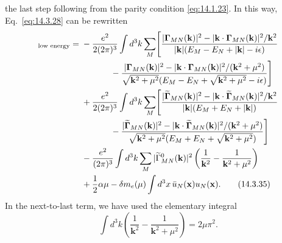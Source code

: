 the last step following from the parity condition \eqref{eq:14.1.23}. In this
way, Eq.~\eqref{eq:14.3.28} can be rewritten
\begin{align}
[\delta E_N]_{\text{low energy}}={}&
-\frac{e^2}{2(2\pi)^3}\int d^3k\sum_M\Biggl[
\frac{|\boldsymbol\Gamma_{MN}(\mathbf k)|^2
-|\mathbf k\cdot\boldsymbol\Gamma_{MN}(\mathbf k)|^2/\mathbf k^2}
{|\mathbf k|(E_M-E_N+|\mathbf k|-i\epsilon)}\notag\\
&\hspace{12mm}-
\frac{|\boldsymbol\Gamma_{MN}(\mathbf k)|^2
-|\mathbf k\cdot\boldsymbol\Gamma_{MN}(\mathbf k)|^2/(\mathbf k^2+\mu^2)}
{\sqrt{\mathbf k^2+\mu^2}
(E_M-E_N+\sqrt{\mathbf k^2+\mu^2}-i\epsilon)}\Biggr]\notag\\
&+\frac{e^2}{2(2\pi)^3}\int d^3k\sum_M\Biggl[
\frac{|\widetilde{\boldsymbol\Gamma}_{MN}(\mathbf k)|^2
-|\mathbf k\cdot\widetilde{\boldsymbol\Gamma}_{MN}(\mathbf k)|^2/\mathbf k^2}
{|\mathbf k|(E_M+E_N+|\mathbf k|)}\notag\\
&\hspace{12mm}-
\frac{|\widetilde{\boldsymbol\Gamma}_{MN}(\mathbf k)|^2
-|\mathbf k\cdot\widetilde{\boldsymbol\Gamma}_{MN}(\mathbf k)|^2/(\mathbf k^2+\mu^2)}
{\sqrt{\mathbf k^2+\mu^2}(E_M+E_N+\sqrt{\mathbf k^2+\mu^2})}
\Biggr]\notag\\
&-\frac{e^2}{(2\pi)^3}\int d^3k\sum_M
|\widetilde\Gamma_{MN}^0(\mathbf k)|^2
\left(\frac{1}{\mathbf k^2}-\frac{1}{\mathbf k^2+\mu^2}\right)
\notag\\
&+\frac12\alpha\mu-\delta m_e(\mu)
\int d^3x\,\bar u_N(\mathbf x)u_N(\mathbf x).
\tag{14.3.35}\label{eq:14.3.35}
\end{align}
In the next-to-last term, we have used the elementary integral
\[
\int d^3k\left(\frac{1}{\mathbf k^2}
-\frac{1}{\mathbf k^2+\mu^2}\right)=2\mu\pi^2.
\]

